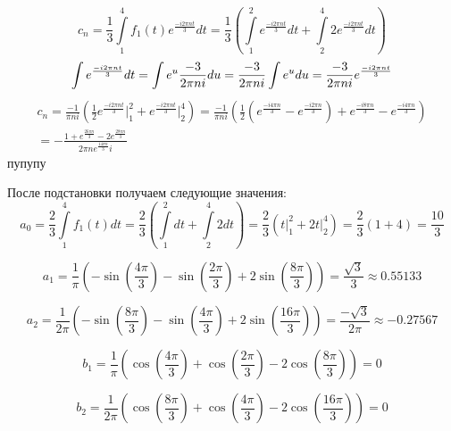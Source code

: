 \begin{equation}
    c_n = \frac{1}{3}\int\limits_{1}^{4} f_1(t)e^{\frac{-i 2\pi n t}{3}} dt = \frac{1}{3}\left(\int\limits_{1}^{2}e^{\frac{-i 2\pi n t}{3}}dt + \int\limits_{2}^{4}2e^{\frac{-i 2\pi n t}{3}}dt \right) 
\end{equation}
\begin{equation}
    \int e^{\frac{-i 2\pi n t}{3}}dt = \int e^u \frac{-3}{2\pi n i} du = \frac{-3}{2\pi n i} \int e^u du = \frac{-3}{2\pi n i} e^\frac{-i2\pi n t}{3}
    \notag
\end{equation}
\begin{multline}
    c_n = \frac{-1}{\pi n i}\left(\frac{1}{2} e^\frac{-i2\pi n t}{3} \Big|_{1}^{2} + e^\frac{-i2\pi n t}{3} \Big|_{2}^{4}\right) =  \frac{-1}{\pi ni} \left( \frac{1}{2}\left(e^\frac{-i4\pi n}{3} - e^\frac{-i2\pi n}{3} \right) + e^\frac{-i8\pi n}{3} - e^\frac{-i4\pi n}{3} \right)\\ = 
    -\frac{1 + e^{\frac{26\pi n}{3}} - 2e^{\frac{28\pi n}{3}}}{2\pi n e^{\frac{14\pi n}{3}}i} 
\end{multline}
пупупу

После подстановки получаем следующие значения:
\begin{equation}
    a_0 = \frac{2}{3} \int\limits_{1}^{4} f_1(t) dt = \frac{2}{3} \left( \int\limits_{1}^{2} dt + \int\limits_{2}^{4} 2 dt \right) = \frac{2}{3} \left(t\Big|_{1}^{2} + 2t\Big|_{2}^{4}\right) = \frac{2}{3} (1 + 4) = \frac{10}{3}
\end{equation}

\begin{equation}
    a_1 = \frac{1}{\pi}\left(-\sin\left( \frac{4\pi}{3}\right) - \sin\left(\frac{2\pi}{3} \right) + 2\sin\left(\frac{8\pi}{3}\right)\right) = \frac{\sqrt3}{3} \approx 0.55133 
\end{equation}

\begin{equation}
    a_2 = \frac{1}{2\pi}\left(-\sin\left( \frac{8\pi}{3}\right) - \sin\left(\frac{4\pi}{3} \right) + 2\sin\left(\frac{16\pi}{3}\right)\right) = \frac{-\sqrt{3}}{2\pi} \approx -0.27567
\end{equation}

\begin{equation}
    b_1 = \frac{1}{\pi}\left(\cos\left( \frac{4\pi}{3}\right) + \cos\left(\frac{2\pi}{3} \right) - 2\cos\left(\frac{8\pi}{3}\right)\right) = 0
\end{equation}

\begin{equation}
    b_2 = \frac{1}{2\pi}\left(\cos\left( \frac{8\pi}{3}\right) + \cos\left(\frac{4\pi}{3} \right) - 2\cos\left(\frac{16\pi}{3}\right)\right) = 0
\end{equation}

